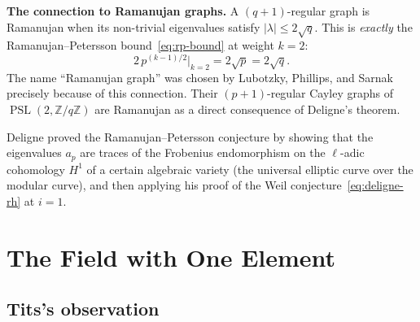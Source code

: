 \documentclass[11pt,a4paper]{article}
\theoremstyle{plain}
\theoremstyle{definition}
\newcommand{\Z}{\mathbb{Z}}
\newcommand{\PSL}{\operatorname{PSL}}
\begin{document}
\begin{tcolorbox}[breakable, colback=yellow!12, colframe=yellow!12,
  boxrule=0pt, sharp corners]
\textbf{The connection to Ramanujan graphs.}
A $(q+1)$-regular graph is Ramanujan when its non-trivial eigenvalues
satisfy $|\lambda| \leq 2\sqrt{q}$. This is \emph{exactly} the
Ramanujan--Petersson bound~\eqref{eq:rp-bound} at weight $k = 2$:
\[
  2\,p^{(k-1)/2}\big|_{k=2} = 2\sqrt{p} = 2\sqrt{q}.
\]
The name ``Ramanujan graph'' was chosen by Lubotzky, Phillips, and
Sarnak~\cite{LPS} precisely because of this connection. Their
$(p+1)$-regular Cayley graphs of $\PSL(2, \Z/q\Z)$ are Ramanujan as
a direct consequence of Deligne's theorem.

Deligne proved the Ramanujan--Petersson conjecture by showing that the
eigenvalues $a_p$ are traces of the Frobenius endomorphism on the
$\ell$-adic cohomology $H^1$ of a certain algebraic variety (the
universal elliptic curve over the modular curve), and then applying
his proof of the Weil conjecture~\eqref{eq:deligne-rh} at $i = 1$.
\end{tcolorbox}


\section{The Field with One Element}
\label{sec:f1}

\subsection{Tits's observation}
\end{document}
